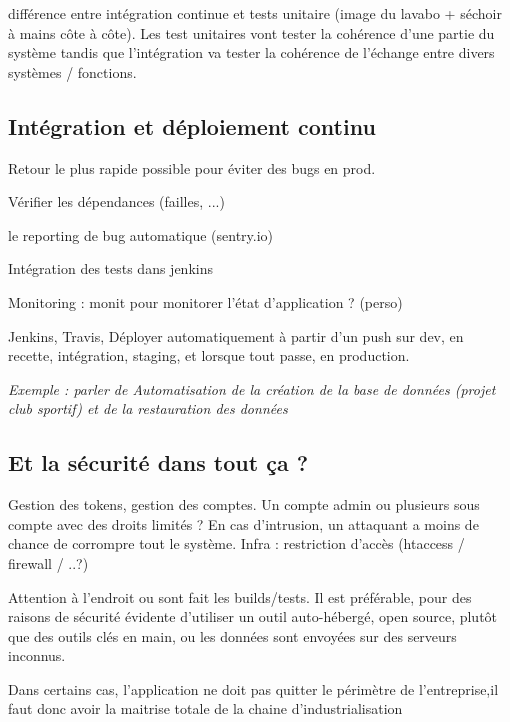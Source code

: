 différence entre intégration continue et tests unitaire (image du lavabo + séchoir à mains côte à côte). Les test unitaires vont tester la cohérence d'une partie du système tandis que l'intégration va tester la cohérence de l'échange entre divers systèmes / fonctions.

\subsection{Intégration et déploiement continu}

Retour le plus rapide possible pour éviter des bugs en prod. 

Vérifier les dépendances (failles, ...)

le reporting de bug automatique (sentry.io)

Intégration des tests dans jenkins

Monitoring : monit pour monitorer l'état d'application ? (perso)

Jenkins, Travis, Déployer automatiquement à partir d'un push sur dev, en recette, intégration, staging, et lorsque tout passe, en production.

\textit{Exemple : parler de \clubSportif Automatisation de la création de la base de données (projet club sportif) et de la restauration des données}

\subsection{Et la sécurité dans tout ça ?}

Gestion des tokens, gestion des comptes.
Un compte admin ou plusieurs sous compte avec des droits limités ? En cas d'intrusion, un attaquant a moins de chance de corrompre tout le système.
Infra : restriction d'accès (htaccess / firewall / ..?)


Attention à l'endroit ou sont fait les builds/tests. Il est préférable, pour des raisons de sécurité évidente d'utiliser un outil auto-hébergé, open source, plutôt que des outils clés en main, ou les données sont envoyées sur des serveurs inconnus. 

Dans certains cas, l'application ne doit pas quitter le périmètre de l'entreprise,il faut donc avoir la maitrise totale de la chaine d'industrialisation
